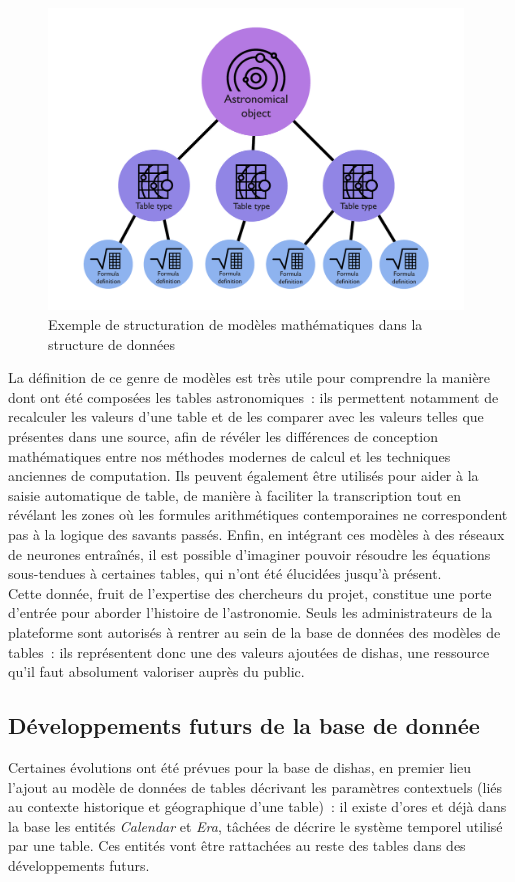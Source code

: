 \documentclass[a4paper,12pt,twoside]{book}
\newcommand{\eng}{\emph}
\newcommand{\dishas}{\gls{dishas}\xspace}
\begin{document}
\begin{figure}[h!]
	\centering
	\includegraphics[width=11cm]{Images/Table-models.png}
	\caption{Exemple de structuration de modèles mathématiques dans la structure de données}
\end{figure}

La définition de ce genre de modèles est très utile pour comprendre la manière dont ont été composées les tables astronomiques~: ils permettent notamment de recalculer les valeurs d'une table et de les comparer avec les valeurs telles que présentes dans une source, afin de révéler les différences de conception mathématiques entre nos méthodes modernes de calcul et les techniques anciennes de computation. Ils peuvent également être utilisés pour aider à la saisie automatique de table, de manière à faciliter la transcription tout en révélant les zones où les formules arithmétiques contemporaines ne correspondent pas à la logique des savants passés. Enfin, en intégrant ces modèles à des réseaux de neurones entraînés, il est possible d'imaginer pouvoir résoudre les équations sous-tendues à certaines tables, qui n'ont été élucidées jusqu'à présent.\\

Cette donnée, fruit de l'expertise des chercheurs du projet, constitue une porte d'entrée pour aborder l'histoire de l'astronomie. Seuls les administrateurs de la plateforme sont autorisés à rentrer au sein de la base de données des modèles de tables~: ils représentent donc une des valeurs ajoutées de \dishas, une ressource qu'il faut absolument valoriser auprès du public.

		\subsection{Développements futurs de la base de donnée}
Certaines évolutions ont été prévues pour la base de \dishas, en premier lieu l'ajout au modèle de données de tables décrivant les paramètres contextuels (liés au contexte historique et géographique d'une table)~: il existe d'ores et déjà dans la base les entités \eng{Calendar} et \eng{Era}, tâchées de décrire le système temporel utilisé par une table. Ces entités vont être rattachées au reste des tables dans des développements futurs.
\end{document}
